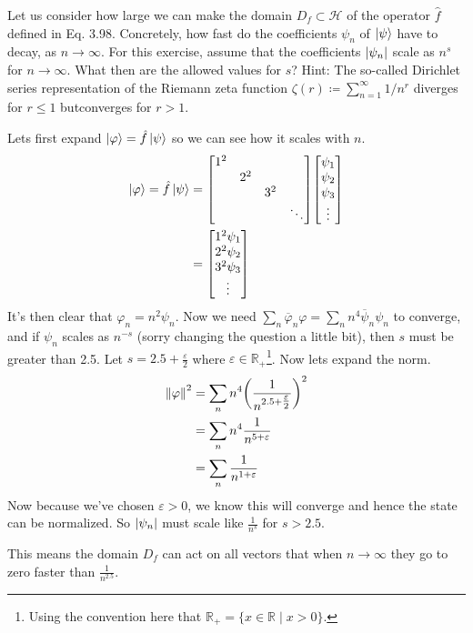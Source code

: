 \documentclass[boxes,pages]{homework}
\makeatletter
\newcommand{\hilb}{\mathcal{H}}
\numberwithin{@problem}{section}
\makeatother
\begin{document}
\setcounter{section}{3}

\begin{problem}
Let us consider how large we can make the domain $D_f\subset\hilb{}$ of the operator $\hat{f}$ defined in Eq. 3.98. Concretely, how fast do the coefficients $\psi_n$ of $\ket{\psi}$ have to decay, as $n\to\infty$. For this exercise, assume that the coefficients $\abs{\psi_n}$ scale as $n^s$ for $n\to\infty$. What then are the allowed values for $s$? Hint: The so-called Dirichlet series representation of the Riemann zeta function $\zeta(r) \coloneqq\sum_{n = 1}^\infty 1/n^r$ diverges for $r\leq 1$ butconverges for $r > 1$.
\end{problem}

\begin{solution}
	Lets first expand $\ket{\varphi} = \hat{f}\ket{\psi}$ so we can see how it scales with $n$.
	\begin{align*}
		\ket{\varphi} = \hat{f}\ket{\psi} & = \mqty[\dmat{1^2,2^2,3^2, \ddots}]\mqty[\psi_1 \\ \psi_2 \\ \psi_3 \\ \vdots] \\
		                                  & = \mqty[1^2\psi_1                               \\ 2^2\psi_2 \\ 3^2\psi_3 \\ \vdots]
	\end{align*}
	It's then clear that $\varphi_n = n^2\psi_n$. Now we need $\sum_n \overline{\varphi}_n\varphi = \sum_n n^4\overline{\psi}_n\psi_n$ to converge, and if $\psi_n$ scales as $n^{-s}$ (sorry changing the question a little bit), then $s$ must be greater than 2.5. Let $s = 2.5 + \frac{\varepsilon}{2}$ where $\varepsilon \in\mathbb{R}_+$\footnote{Using the convention here that $\mathbb{R}_+ = \{x\in \mathbb{R} \mid x > 0\}$.}. Now lets expand the norm.
	\begin{align*}
		\norm{\varphi}^2 & = \sum_n n^4 \qty(\frac{1}{n^{2.5 + \tfrac{\varepsilon}{2}}})^2 \\
		                 & = \sum_n n^4 \frac{1}{n^{5 + \varepsilon}}                      \\
		                 & = \sum_n \frac{1}{n^{1 + \varepsilon}}
	\end{align*}
	Now because we've chosen $\varepsilon > 0$, we know this will converge and hence the state can be normalized. So $\abs{\psi_n}$ must scale like $\frac{1}{n^s}$ for $s > 2.5$.

	This means the domain $D_f$ can act on all vectors that when $n\to\infty$ they go to zero faster than $\frac{1}{n^{2.5}}$.
\end{solution}
\end{document}
